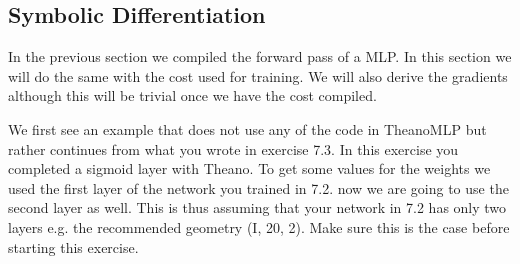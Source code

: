 \subsection{Symbolic Differentiation}

In the previous section we compiled the forward pass of a MLP. In this section we will do the same with the cost used for training. We will also derive the gradients although this will be trivial once we have the cost compiled.     
\begin{exercise}
We first see an example that does not use any of the code in TheanoMLP but rather continues from what you wrote in exercise 7.3. In this exercise you completed a sigmoid layer with Theano. To get some values for the weights we used the first layer of the network you trained in 7.2. now we are going to use the second layer as well. This is thus assuming that your network in 7.2 has only two layers e.g. the recommended geometry (I, 20, 2). Make sure this is the case before starting this exercise.  


\end{exercise}
